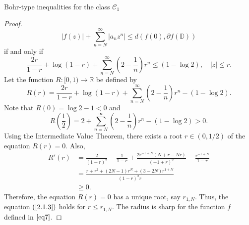 \documentclass[12pt,a4paper,reqno]{amsart}
\theoremstyle{definition}
\theoremstyle{plain}
\numberwithin{equation}{section}
\begin{document}
\begin{section}{Bohr-type inequalities for the class $\mathcal{C}_1$}
\begin{proof}
\begin{equation*}
|f(z)|+ \sum_{n=N}^{\infty} |a_n z^n|  \le  d(f(0), \partial{f(\mathbb{D})})
\end{equation*}
if and only if \begin{equation*}
\frac{2r}{1-r} +\log(1-r) + \sum_{n=N}^{\infty} \left( 2-\frac{1}{n} \right) r^{n} \le (1 - \log{2}),\quad |z|\leq r.
\end{equation*}
Let the function $R:[0, 1)\rightarrow \mathbb{R}$ be defined by
\begin{equation*}
R(r)=\frac{2r}{1-r} +\log(1-r) + \sum_{n=N}^{\infty} \left( 2-\frac{1}{n} \right) r^{n}- (1 - \log{2}).
\end{equation*}
Note that $R(0)=\log2-1<0$ and \[R\left(\frac{1}{2}\right)=2+\sum_{n=N}^{\infty} \left( 2-\frac{1}{n} \right) r^{n}- (1 - \log{2})>0.\]
Using the Intermediate Value Theorem, there exists a root $r\in(0, 1/2)$  of the equation $R(r)=0$. Also,
\begin{align*}
R'(r)&=\frac{2}{(1-r)^2}-\frac{1}{1-r}+\frac{2 r^{-1+N} (N+r-N r)}{(-1+r)^2}-\frac{r^{-1+N}}{1-r}\\
&=\frac{r+r^2+(2 N-1) r^N+(3-2 N) r^{1+N}}{(1-r)^2 r}\\
&\geq0.
\end{align*}
Therefore, the equation $R(r)=0$ has a unique root, say $r_{1,N}$. Thus, the  equation $(\ref{2.1.3})$ holds for $r \le r_{1,N}$.
The radius is sharp for the function $f$ defined in $\eqref{eq7}$.%

\end{proof}
\end{section}
\end{document}
